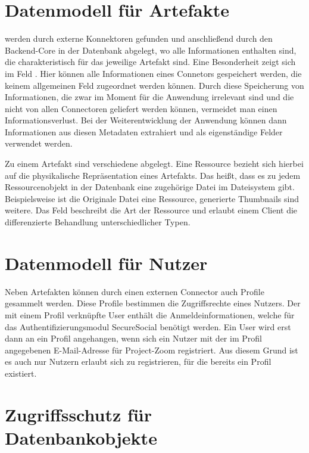 \section{Datenmodell für Artefakte}

 werden durch externe Konnektoren gefunden und anschließend durch den Backend-Core in der Datenbank abgelegt, wo alle Informationen enthalten sind, die charakteristisch für das jeweilige Artefakt sind. Eine Besonderheit zeigt sich im Feld . Hier können alle Informationen eines Connetors gespeichert werden, die keinem allgemeinen Feld zugeordnet werden können. Durch diese Speicherung von Informationen, die zwar im Moment für die Anwendung irrelevant sind und die nicht von allen Connectoren geliefert werden können, vermeidet man einen Informationsverlust. Bei der Weiterentwicklung der Anwendung können dann Informationen aus diesen Metadaten extrahiert und als eigenständige Felder verwendet werden. 

Zu einem Artefakt sind verschiedene  abgelegt. Eine Ressource bezieht sich hierbei auf die physikalische Repräsentation eines Artefakts. Das heißt, dass es zu jedem Ressourcenobjekt in der Datenbank eine zugehörige Datei im Dateisystem gibt. Beispielsweise ist die Originale Datei eine Ressource, generierte Thumbnails sind weitere. Das Feld  beschreibt die Art der Ressource und erlaubt einem Client die differenzierte Behandlung unterschiedlicher Typen.  

\section{Datenmodell für Nutzer}

Neben Artefakten können durch einen externen Connector auch Profile gesammelt werden. Diese Profile bestimmen die Zugriffsrechte eines Nutzers. Der mit einem Profil verknüpfte User enthält die Anmeldeinformationen, welche für das Authentifizierungsmodul SecureSocial benötigt werden. Ein User wird erst dann an ein Profil angehangen, wenn sich ein Nutzer mit der im Profil angegebenen E-Mail-Adresse für Project-Zoom registriert. Aus diesem Grund ist es auch nur Nutzern erlaubt sich zu registrieren, für die bereits ein Profil existiert.

\section{Zugriffsschutz für Datenbankobjekte}

